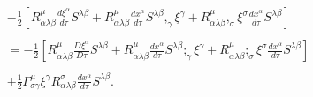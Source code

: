 \begin{equation}
\begin{array}{c}
-\frac{1}{2}[R_{\alpha \lambda \beta }^{\mu }\frac{d\xi ^{\alpha }}{d\tau }%
S^{\lambda \beta }+R_{\alpha \lambda \beta }^{\mu }\frac{dx^{\alpha }}{d\tau 
}S^{\lambda \beta },_{\gamma }\xi ^{\gamma }+R_{\alpha \lambda \beta }^{\mu
},_{\sigma }\xi ^{\sigma }\frac{dx^{\alpha }}{d\tau }S^{\lambda \beta }] \\ 
\\ 
=-\frac{1}{2}[R_{\alpha \lambda \beta }^{\mu }\frac{D\xi ^{\alpha }}{D\tau }%
S^{\lambda \beta }+R_{\alpha \lambda \beta }^{\mu }\frac{dx^{\alpha }}{d\tau 
}S^{\lambda \beta };_{\gamma }\xi ^{\gamma }+R_{\alpha \lambda \beta }^{\mu
};_{\sigma }\xi ^{\sigma }\frac{dx^{\alpha }}{d\tau }S^{\lambda \beta }] \\ 
\\ 
+\frac{1}{2}\Gamma _{\sigma \gamma }^{\mu }\xi ^{\gamma }R_{\alpha \lambda
\beta }^{\sigma }\frac{dx^{\alpha }}{d\tau }S^{\lambda \beta }.
\end{array}
\label{27}
\end{equation}

